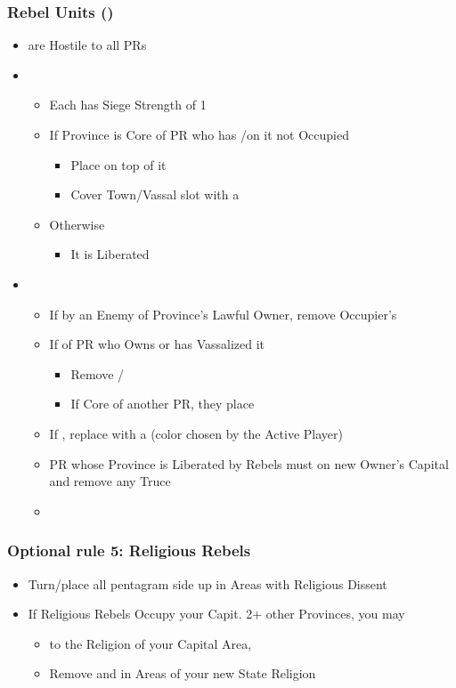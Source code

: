 \documentclass[10pt]{article}
\begin{document}
\subsubsection*{Rebel Units (\rebel)}
\begin{itemize}
	\item \rebels are Hostile to all PRs
	\item {}
	\begin{itemize}
		\item Each \rebel has Siege Strength of 1
		\item If Province is Core of PR who has \town/\vassal on it  not Occupied
		\begin{itemize}
			\item Place \rebeltown on top of it
			\item Cover Town/Vassal slot with a \cube
		\end{itemize}
		\item Otherwise
		\begin{itemize}
			\item It is Liberated
		\end{itemize}
	\end{itemize}
	\item {}
	\begin{itemize}
		\item If  by an Enemy of Province's Lawful Owner, remove Occupier's \town
		\item If  of PR who Owns or has Vassalized it
		\begin{itemize}
			\item Remove \town/\vassal
			\item If Core of another PR, they place \town
		\end{itemize}
		\item If , replace \town with a \dnpr (color chosen by the Active Player)
		\item PR whose Province is Liberated by Rebels must  on new Owner's Capital and remove any Truce
		\item {}
	\end{itemize}
\end{itemize}
\subsubsection*{Optional rule 5: Religious Rebels}
\begin{itemize}
	\item Turn/place all \rebeltowns pentagram side up in Areas with Religious Dissent
	\item If Religious Rebels Occupy your Capit.  2+ other Provinces, you may
	\begin{itemize}
		\item {} to the Religion of your Capital Area, 
		\item Remove \rebels and \rebeltowns in Areas of your new State Religion
	\end{itemize}
\end{itemize}
\end{document}
